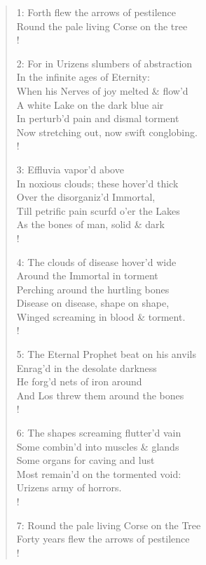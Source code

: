 \documentclass[9pt]{extarticle}
\begin{document}
\begin{verse}
\begin{altverse} 
		
		1: Forth flew the arrows of pestilence\\
		Round the pale living Corse on the tree\\!
		
		2: For in Urizens slumbers of abstraction\\
		In the infinite ages of Eternity:\\
		When his Nerves of joy melted \& flow’d\\
		A white Lake on the dark blue air\\
		In perturb’d pain and dismal torment\\
		Now stretching out, now swift conglobing.\\!
		
		3: Effluvia vapor’d above\\
		In noxious clouds; these hover’d thick\\
		Over the disorganiz’d Immortal,\\
		Till petrific pain scurfd o’er the Lakes\\
		As the bones of man, solid \& dark\\!
		
		4: The clouds of disease hover’d wide\\
		Around the Immortal in torment\\
		Perching around the hurtling bones\\
		Disease on disease, shape on shape,\\
		Winged screaming in blood \& torment.\\!
		
		5: The Eternal Prophet beat on his anvils\\
		Enrag’d in the desolate darkness\\
		He forg’d nets of iron around\\
		And Los threw them around the bones\\!
		
		6: The shapes screaming flutter’d vain\\
		Some combin’d into muscles \& glands\\
		Some organs for caving and lust\\
		Most remain’d on the tormented void:\\
		Urizens army of horrors.\\!
		
		7: Round the pale living Corse on the Tree\\
		Forty years flew the arrows of pestilence\\!
		

\end{altverse}
\end{verse}
\end{document}

